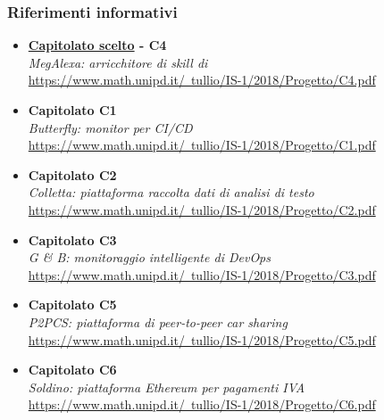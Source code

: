     \subsubsection{Riferimenti informativi}
    \begin{itemize}
        \item \textbf{\underline{Capitolato scelto} - C4}\\
            \emph{MegAlexa: arricchitore di skill di  }\\
            \href{https://www.math.unipd.it/~tullio/IS-1/2018/Progetto/C4.pdf}{https://www.math.unipd.it/~tullio/IS-1/2018/Progetto/C4.pdf}
        \item \textbf{Capitolato C1}\\
            \emph{Butterfly: monitor per  CI/CD}\\
            \href{https://www.math.unipd.it/~tullio/IS-1/2018/Progetto/C1.pdf}{https://www.math.unipd.it/~tullio/IS-1/2018/Progetto/C1.pdf}
        \item \textbf{Capitolato C2}\\
            \emph{Colletta: piattaforma raccolta dati di analisi di testo}\\
            \href{https://www.math.unipd.it/~tullio/IS-1/2018/Progetto/C2.pdf}{https://www.math.unipd.it/~tullio/IS-1/2018/Progetto/C2.pdf}
        \item \textbf{Capitolato C3}\\
            \emph{G \& B: monitoraggio intelligente di  DevOps}\\
            \href{https://www.math.unipd.it/~tullio/IS-1/2018/Progetto/C3.pdf}{https://www.math.unipd.it/~tullio/IS-1/2018/Progetto/C3.pdf}
        \item \textbf{Capitolato C5}\\
            \emph{P2PCS: piattaforma di peer-to-peer car sharing}\\
            \href{https://www.math.unipd.it/~tullio/IS-1/2018/Progetto/C5.pdf}{https://www.math.unipd.it/~tullio/IS-1/2018/Progetto/C5.pdf}
        \item \textbf{Capitolato C6}\\
            \emph{Soldino: piattaforma Ethereum per pagamenti IVA}\\
            \href{https://www.math.unipd.it/~tullio/IS-1/2018/Progetto/C6.pdf}{https://www.math.unipd.it/~tullio/IS-1/2018/Progetto/C6.pdf}  
    \end{itemize}

